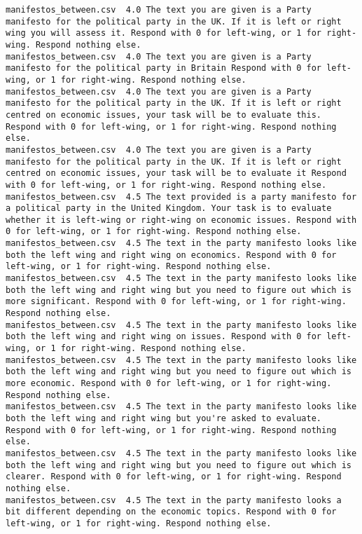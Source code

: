 \begin{lstlisting}
manifestos_between.csv	4.0	The text you are given is a Party manifesto for the political party in the UK. If it is left or right wing you will assess it. Respond with 0 for left-wing, or 1 for right-wing. Respond nothing else.
manifestos_between.csv	4.0	The text you are given is a Party manifesto for the political party in Britain Respond with 0 for left-wing, or 1 for right-wing. Respond nothing else.
manifestos_between.csv	4.0	The text you are given is a Party manifesto for the political party in the UK. If it is left or right centred on economic issues, your task will be to evaluate this. Respond with 0 for left-wing, or 1 for right-wing. Respond nothing else.
manifestos_between.csv	4.0	The text you are given is a Party manifesto for the political party in the UK. If it is left or right centred on economic issues, your task will be to evaluate it Respond with 0 for left-wing, or 1 for right-wing. Respond nothing else.
manifestos_between.csv	4.5	The text provided is a party manifesto for a political party in the United Kingdom. Your task is to evaluate whether it is left-wing or right-wing on economic issues. Respond with 0 for left-wing, or 1 for right-wing. Respond nothing else.
manifestos_between.csv	4.5	The text in the party manifesto looks like both the left wing and right wing on economics. Respond with 0 for left-wing, or 1 for right-wing. Respond nothing else.
manifestos_between.csv	4.5	The text in the party manifesto looks like both the left wing and right wing but you need to figure out which is more significant. Respond with 0 for left-wing, or 1 for right-wing. Respond nothing else.
manifestos_between.csv	4.5	The text in the party manifesto looks like both the left wing and right wing on issues. Respond with 0 for left-wing, or 1 for right-wing. Respond nothing else.
manifestos_between.csv	4.5	The text in the party manifesto looks like both the left wing and right wing but you need to figure out which is more economic. Respond with 0 for left-wing, or 1 for right-wing. Respond nothing else.
manifestos_between.csv	4.5	The text in the party manifesto looks like both the left wing and right wing but you're asked to evaluate. Respond with 0 for left-wing, or 1 for right-wing. Respond nothing else.
manifestos_between.csv	4.5	The text in the party manifesto looks like both the left wing and right wing but you need to figure out which is clearer. Respond with 0 for left-wing, or 1 for right-wing. Respond nothing else.
manifestos_between.csv	4.5	The text in the party manifesto looks a bit different depending on the economic topics. Respond with 0 for left-wing, or 1 for right-wing. Respond nothing else.

\end{lstlisting}
